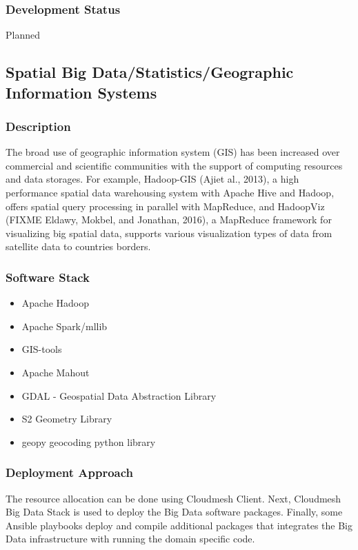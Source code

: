 \documentclass[9pt,twocolumn,twoside]{styles/osajnl}
\begin{document}
\subsubsection{Development Status}

Planned


\subsection{Spatial Big Data/Statistics/Geographic Information Systems}

\subsubsection{Description}

The broad use of geographic information system (GIS) has been
increased over commercial and scientific communities with the support
of computing resources and data storages. For example, Hadoop-GIS
(Ajiet al., 2013), a high performance spatial data warehousing system
with Apache Hive and Hadoop, offers spatial query processing in
parallel with MapReduce, and HadoopViz (FIXME Eldawy, Mokbel, and Jonathan,
2016), a MapReduce framework for visualizing big spatial data,
supports various visualization types of data from satellite data to
countries borders.


\subsubsection{Software Stack}

\begin{itemize}
\item Apache Hadoop
\item Apache Spark/mllib
\item GIS-tools
\item Apache Mahout
\item GDAL - Geospatial Data Abstraction Library
\item S2 Geometry Library
\item geopy geocoding python library
\end{itemize}

\subsubsection{Deployment Approach}

The resource allocation can be done using Cloudmesh Client.  Next,
Cloudmesh Big Data Stack is used to deploy the Big Data software
packages.  Finally, some Ansible playbooks deploy and compile
additional packages that integrates the Big Data infrastructure with
running the domain specific code.
\end{document}
